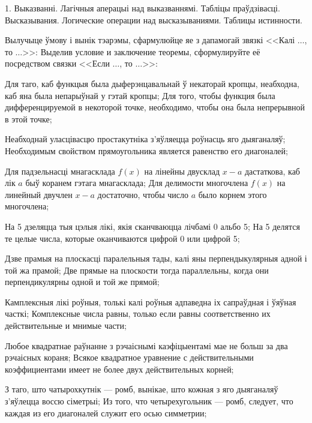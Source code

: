 



\biLangHeader
{1. Выказванні. Лагічныя аперацыі над выказваннямі. Табліцы праўдзівасці.}
{Высказывания. Логические операции над высказываниями. Таблицы истинности.}

\begin{problemList}
	
\problemItemSimple
{Вылучыце ўмову і вынік тэарэмы, сфармулюйце яе з дапамогай звязкі <<Калі $\ldots$, то $\ldots$>>:}
{Выделив условие и заключение теоремы, сформулируйте её посредством связки <<Если $\ldots$, то $\ldots$>>:}

\begin{belarusianEnumerate}

\problemItemSimple
{Для таго, каб функцыя была дыферэнцавальнай ў некаторай кропцы, неабходна, каб яна была непарыўнай у гэтай кропцы;}
{Для того, чтобы функция была дифференцируемой в некоторой точке, необходимо, чтобы она была непрерывной в этой точке;}

\problemItemSimple
{Неабходнай уласцівасцю простакутніка з'яўляецца роўнасць яго дыяганаляў;}
{Необходимым свойством прямоугольника является равенство его диагоналей;}

\problemItemSimple
{Для падзельнасці мнагасклада $f(x)$ на лінейны двусклад $x - a$ дастаткова, каб лік $a$ быў коранем гэтага мнагасклада;}
{Для делимости многочлена $f(x)$ на линейный двучлен $x - a$ достаточно, чтобы число $a$ было корнем этого многочлена;}

\problemItemSimple
{На 5 дзеляцца тыя цэлыя лікі, якія сканчваюцца лічбамі 0 альбо 5;}
{На 5 делятся те целые числа, которые оканчиваются цифрой 0 или цифрой 5;}

\problemItemSimple
{Дзве прамыя на плоскасці паралельныя тады, калі яны перпендыкулярныя адной і той жа прамой;}
{Две прямые на плоскости тогда параллельны, когда они перпендикулярны одной и той же прямой;}

\problemItemSimple
{Камплексныя лікі роўныя, толькі калі роўныя адпаведна іх сапраўдная і ўяўная часткі;}
{Комплексные числа равны, только если равны соответственно их действительные и мнимые части;}

\problemItemSimple
{Любое квадратнае раўнанне з рэчаіснымі каэфіцыентамі мае не больш за два рэчаісных кораня;}
{Всякое квадратное уравнение с действительными коэффициентами имеет не более двух действительных корней;}

\problemItemSimple
{З таго, што чатырохкутнік --- ромб, вынікае, што кожная з яго дыяганаляў з'яўлецца воссю сіметрыі;}
{Из того, что четырехугольник --- ромб, следует, что каждая из его диагоналей служит его осью симметрии;}


\end{belarusianEnumerate}
\end{problemList}
